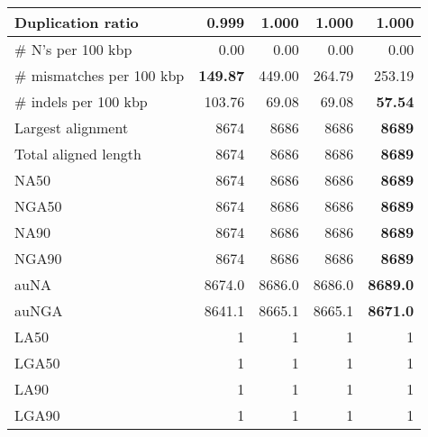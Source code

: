 \documentclass[12pt,a4paper]{article}
\begin{document}
\begin{table}[ht]
\begin{center}
\begin{tabular}{|l*{4}{|r}|}
Duplication ratio & {\bf 0.999} & 1.000 & 1.000 & 1.000 \\ \hline
\# N's per 100 kbp & 0.00 & 0.00 & 0.00 & 0.00 \\ \hline
\# mismatches per 100 kbp & {\bf 149.87} & 449.00 & 264.79 & 253.19 \\ \hline
\# indels per 100 kbp & 103.76 & 69.08 & 69.08 & {\bf 57.54} \\ \hline
Largest alignment & 8674 & 8686 & 8686 & {\bf 8689} \\ \hline
Total aligned length & 8674 & 8686 & 8686 & {\bf 8689} \\ \hline
NA50 & 8674 & 8686 & 8686 & {\bf 8689} \\ \hline
NGA50 & 8674 & 8686 & 8686 & {\bf 8689} \\ \hline
NA90 & 8674 & 8686 & 8686 & {\bf 8689} \\ \hline
NGA90 & 8674 & 8686 & 8686 & {\bf 8689} \\ \hline
auNA & 8674.0 & 8686.0 & 8686.0 & {\bf 8689.0} \\ \hline
auNGA & 8641.1 & 8665.1 & 8665.1 & {\bf 8671.0} \\ \hline
LA50 & 1 & 1 & 1 & 1 \\ \hline
LGA50 & 1 & 1 & 1 & 1 \\ \hline
LA90 & 1 & 1 & 1 & 1 \\ \hline
LGA90 & 1 & 1 & 1 & 1 \\ \hline
\end{tabular}
\end{center}
\end{table}
\end{document}
